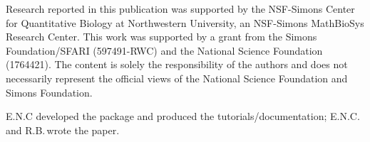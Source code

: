 \documentclass[codesnippet]{jss}
\begin{document}
Research reported in this publication was supported by the NSF-Simons Center for Quantitative Biology at Northwestern University, an NSF-Simons MathBioSys Research Center. This work was supported by a grant from the Simons Foundation/SFARI (597491-RWC) and the National Science Foundation (1764421). The content is solely the responsibility of the authors and does not necessarily represent the official views of the National Science Foundation and Simons Foundation.

E.N.C developed the  package and produced the tutorials/documentation; E.N.C.\,and R.B.\,wrote the paper.




\newpage

\end{document}
